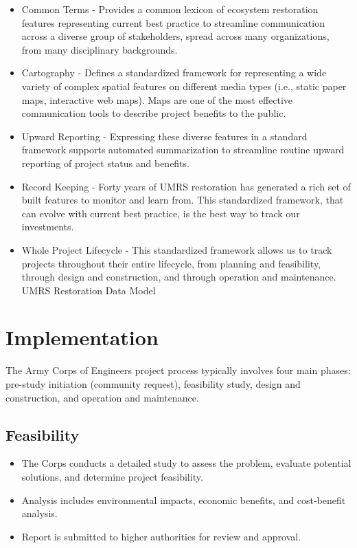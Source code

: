 \documentclass[
  letterpaper,
  DIV=11,
  numbers=noendperiod]{scrreprt}
\providecommand{\tightlist}{%
  \setlength{\itemsep}{0pt}\setlength{\parskip}{0pt}}
\begin{document}
\begin{itemize}
\tightlist
\item
  Common Terms - Provides a common lexicon of ecosystem restoration
  features representing current best practice to streamline
  communication across a diverse group of stakeholders, spread across
  many organizations, from many disciplinary backgrounds.
\item
  Cartography - Defines a standardized framework for representing a wide
  variety of complex spatial features on different media types (i.e.,
  static paper maps, interactive web maps). Maps are one of the most
  effective communication tools to describe project benefits to the
  public.
\item
  Upward Reporting - Expressing these diverse features in a standard
  framework supports automated summarization to streamline routine
  upward reporting of project status and benefits.
\item
  Record Keeping - Forty years of UMRS restoration has generated a rich
  set of built features to monitor and learn from. This standardized
  framework, that can evolve with current best practice, is the best way
  to track our investments.
\item
  Whole Project Lifecycle - This standardized framework allows us to
  track projects throughout their entire lifecycle, from planning and
  feasibility, through design and construction, and through operation
  and maintenance. UMRS Restoration Data Model
\end{itemize}

\section{Implementation}\label{implementation}

The Army Corps of Engineers project process typically involves four main
phases: pre-study initiation (community request), feasibility study,
design and construction, and operation and maintenance.

\subsection{Feasibility}\label{feasibility}

\begin{itemize}
\tightlist
\item
  The Corps conducts a detailed study to assess the problem, evaluate
  potential solutions, and determine project feasibility.
\item
  Analysis includes environmental impacts, economic benefits, and
  cost-benefit analysis.
\item
  Report is submitted to higher authorities for review and approval.
\end{itemize}
\end{document}

